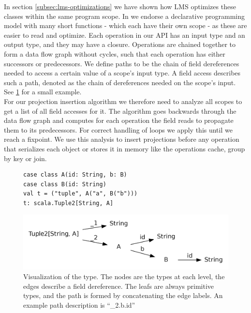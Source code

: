 In section \ref{subsec:lms-optimizations} we have shown how LMS optimizes these classes within the same program scope. In \tool we endorse a declarative programming model with many short functions - which each have their own scope - as these are easier to read and optimize. Each operation in our API has an input type and an output type, and they may have a closure. Operations are chained together to form a data flow graph without cycles, such that each operation has either successors or predecessors. We define paths to be the chain of field dereferences needed to access a certain value of a scope's input type. A field access describes such a path, denoted as the chain of dereferences needed on the scope's input. See \ref{fig:type_tree} for a small example. \\
For our projection insertion algorithm we therefore need to analyze all scopes to get a list of all field accesses for it. The algorithm goes backwards through the data flow graph and computes for each operation the field reads to propagate them to its predecessors. For correct handling of loops we apply this until we reach a fixpoint. We use this analysis to insert projections before any operation that serializes each object or stores it in memory like the operations cache, group by key or join.
\begin{figure}
\begin{lstlisting}[name=code, caption=Types for field access example, captionpos=b]
case class A(id: String, b: B)
case class B(id: String)  
val t = ("tuple", A("a", B("b"))) 
t: scala.Tuple2[String, A]
\end{lstlisting}
\centering
\includegraphics[clip=true, width=0.95\columnwidth]{dot/access.png}
\caption{Visualization of the type. The nodes are the types at each level, the edges describe a field dereference. The leafs are always primitive types, and the path is formed by concatenating the edge labels. An example path description is ``\_2.b.id''}
\label{fig:type_tree}
\end{figure}
